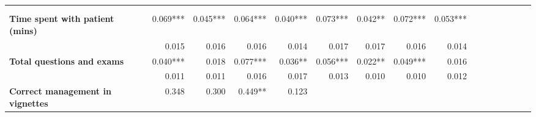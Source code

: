 \begin{tabular}{@{\extracolsep{5pt}}lrrrrrrrrrrrrrrr}
\toprule
&  &  &  &  &  &  &  &  \\
{\bf } &  &  &  &  &  &  &  &  \\
\hline
{\bf Time spent with patient (mins)} & 0.069*** & 0.045*** & 0.064*** & 0.040*** & 0.073*** & 0.042**\phantom{*} & 0.072*** & 0.053*** \\
{\bf } & 0.015\phantom{***} & 0.016\phantom{***} & 0.016\phantom{***} & 0.014\phantom{***} & 0.017\phantom{***} & 0.017\phantom{***} & 0.016\phantom{***} & 0.014\phantom{***} \\
{\bf Total questions and exams} & 0.040*** & 0.018\phantom{***} & 0.077*** & 0.036**\phantom{*} & 0.056*** & 0.022**\phantom{*} & 0.049*** & 0.016\phantom{***} \\
{\bf } & 0.011\phantom{***} & 0.011\phantom{***} & 0.016\phantom{***} & 0.017\phantom{***} & 0.013\phantom{***} & 0.010\phantom{***} & 0.010\phantom{***} & 0.012\phantom{***} \\
{\bf Correct management in vignettes} & 0.348\phantom{***} & 0.300\phantom{***} & 0.449**\phantom{*} & 0.123\phantom{***} & \phantom{***} & \phantom{***} & \phantom{***} & \phantom{***} \\

\end{tabular}
